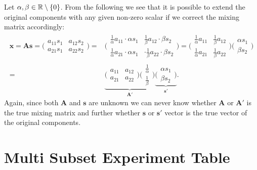		Let $\alpha,\beta \in \mathbb{R} \setminus \{0\}$. From the following we see that it is possible to extend the original components with any given non-zero scalar if we correct the mixing matrix accordingly:
		\begin{align*}
			\textbf{x}=\textbf{A}\textbf{s}=\bigg(\begin{array}{rr}
				a_{11}s_1 & a_{12}s_2 \\
				a_{21}s_1 & a_{22}s_2
			\end{array}\bigg)=&
			\bigg(\begin{array}{rr}
				\frac{1}{\alpha} a_{11} \cdot \alpha s_1 & \frac{1}{\beta} a_{12} \cdot \beta s_2 \\
				\frac{1}{\alpha} a_{21} \cdot \alpha s_1 & \cdot\frac{1}{\beta} a_{22} \cdot \beta s_2
			\end{array}\bigg)=
			\bigg(\begin{array}{rr}
				\frac{1}{\alpha} a_{11} & \frac{1}{\beta} a_{12} \\
				\frac{1}{\alpha} a_{21} & \frac{1}{\beta} a_{22} 
			\end{array}\bigg)
			\bigg(\begin{array}{r}
				\alpha s_1\\
				\beta s_2
			\end{array}\bigg)\\
			=&\underbrace{
			\bigg(\begin{array}{rr}
				a_{11} & a_{12} \\
				a_{21} & a_{22} 
			\end{array}\bigg)\bigg(\begin{array}{r}
				\frac{1}{\alpha}\\
				\frac{1}{\beta}
			\end{array}\bigg)
			}_{\textbf{A}'}\underbrace{
			\bigg(\begin{array}{r}
				\alpha s_1\\
				\beta s_2
			\end{array}\bigg)
			}_{\textbf{s}'}.
		\end{align*} 
		Again, since both $\textbf{A}$ and $\textbf{s}$ are unknown we can never know whether $\textbf{A}$ or $\textbf{A}'$ is the true mixing matrix and further whether $\textbf{s}$ or $\textbf{s}'$ vector is the true vector of the original components. 

\section{Multi Subset Experiment Table}\label{app:subset-table}

